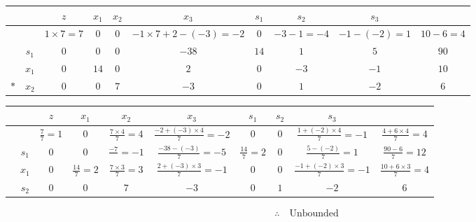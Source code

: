 \documentclass[a4paper,12pt]{article}
\begin{document}
\begin{table}[H]
    \tiny
    \begin{tabularx}{\textwidth}{cc|ccccccc|c}
            &       & $z$              & $x_1$ & $x_2$ & $x_3$                         & $s_1$ & $s_2$         & $s_3$           &              \\
        \hline
            &       & $1 \times 7 = 7$ & $0$   & $0$   & $-1 \times 7 + 2 - (-3) = -2$ & $0$   & $-3 - 1 = -4$ & $-1 - (-2) = 1$ & $10 - 6 = 4$ \\
        \hline
            & $s_1$ & $0$              & $0$   & $0$   & $-38$                         & $14$  & $1$           & $5$             & $90$         \\
            & $x_1$ & $0$              & $14$  & $0$   & $2$                           & $0$   & $-3$          & $-1$            & $10$         \\
        $*$ & $x_2$ & $0$              & $0$   & $7$   & $-3$                          & $0$   & $1$           & $-2$            & $6$          \\
    \end{tabularx}
\end{table}

\begin{table}[H]
    \tiny
    \begin{tabularx}{\textwidth}{cc|ccccccc|c}
         &       & $z$               & $x_1$              & $x_2$                      & $x_3$                               & $s_1$              & $s_2$ & $s_3$                               &                                 \\
        \hline
         &       & $\frac{7}{7} = 1$ & $0$                & $\frac{7 \times 4}{7} = 4$ & $\frac{-2 + (-3) \times 4}{7} = -2$ & $0$                & $0$   & $\frac{1 + (-2) \times 4}{7} = -1$  & $\frac{4 + 6 \times 4}{7} = 4$  \\
        \hline
         & $s_1$ & $0$               & $0$                & $\frac{- 7}{} = -1$        & $\frac{-38 - (-3)}{7} = -5$         & $\frac{14}{7} = 2$ & $0$   & $\frac{5 - (-2)}{7} = 1$            & $\frac{90 - 6}{7} = 12$         \\
         & $x_1$ & $0$               & $\frac{14}{7} = 2$ & $\frac{7 \times 3}{7} = 3$ & $\frac{2 + (-3) \times 3}{7} = -1$  & $0$                & $0$   & $\frac{-1 + (-2) \times 3}{7} = -1$ & $\frac{10 + 6 \times 3}{7} = 4$ \\
         & $s_2$ & $0$               & $0$                & $7$                        & $-3$                                & $0$                & $1$   & $-2$                                & $6$                             \\
    \end{tabularx}
\end{table}

\begin{align*}
    \therefore \quad \text{Unbounded} \\
\end{align*}
\end{document}
